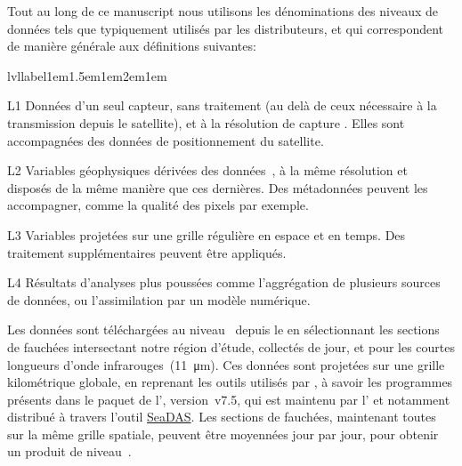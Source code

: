\begin{note}[label={note:data-levels}, breakable]
  Tout au long de ce manuscript nous utilisons les dénominations des niveaux de données tels que typiquement utilisés par les distributeurs, et qui correspondent de manière générale aux définitions suivantes:
  \newcommand*\lvllabel[1]{\hspace\labelsep \normalfont\bfseries\lfstyle #1}%
  \begin{flexlabelled}{lvllabel}{1em}{1.5em}{1em}{2em}{1em}
    \item[L1] Données d'un seul capteur, sans traitement (au delà de ceux nécessaire à la transmission depuis le satellite), et à la résolution de capture .
    Elles sont accompagnées des données de positionnement du satellite.

    \item[L2] Variables géophysiques dérivées des données~, à la même résolution et disposés de la même manière que ces dernières.
    Des métadonnées peuvent les accompagner, comme la qualité des pixels par exemple.

    \item[L3] Variables projetées sur une grille régulière en espace et en temps.
    Des traitement supplémentaires peuvent être appliqués.

    \item[L4] Résultats d'analyses plus poussées comme l'aggrégation de plusieurs sources de données, ou l'assimilation par un modèle numérique.
  \end{flexlabelled}
\end{note}

Les données sont téléchargées au niveau~ depuis le  en sélectionnant les sections de fauchées\footnotemark{} intersectant notre région d'étude, collectés de jour, et pour les courtes longueurs d'onde infrarouges~(\qty{11}{\um}).
Ces données sont projetées sur une grille kilométrique globale, en reprenant les outils utilisés par \citeauthor{liu_2016}, à savoir les programmes présents dans le paquet de l'\href{https://oceandata.sci.gsfc.nasa.gov/ocssw}{}, version~v7.5, qui est maintenu par l' et notamment distribué à travers l'outil \href{https://seadas.gsfc.nasa.gov/}{SeaDAS}.
Les sections de fauchées, maintenant toutes sur la même grille spatiale, peuvent être moyennées jour par jour, pour obtenir un produit de niveau~.

